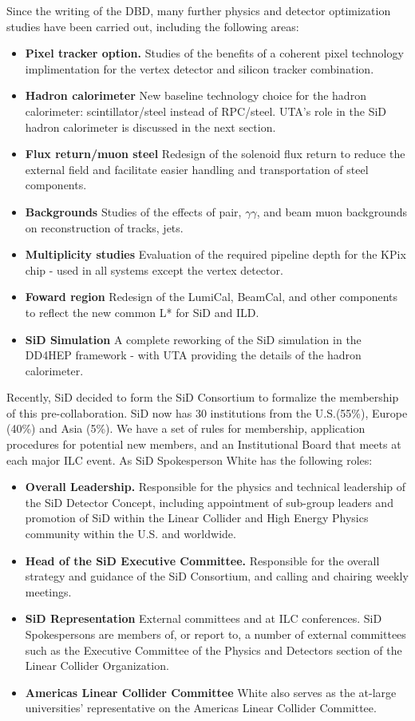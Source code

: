 Since the writing of the DBD, many further physics and detector optimization studies have been carried
out, including the following areas:
\begin{itemize}
\item {\bf Pixel tracker option.} Studies of the benefits of a coherent pixel technology implimentation for the
vertex detector and silicon tracker combination.
\item {\bf Hadron calorimeter} New baseline technology choice for the hadron calorimeter: scintillator/steel instead of RPC/steel.
UTA's role in the SiD hadron calorimeter is discussed in the next section.
\item {\bf Flux return/muon steel} Redesign of the solenoid flux return to reduce the external field and facilitate easier handling
and transportation of steel components. 
\item {\bf Backgrounds} Studies of the effects of pair, $ \gamma\gamma $, and beam muon backgrounds on reconstruction of tracks, jets.
\item {\bf Multiplicity studies} Evaluation of the required pipeline depth for the KPix chip - used in all systems except the vertex
 detector.
 \item {\bf Foward region} Redesign of the LumiCal, BeamCal, and other components to reflect the new common L* for SiD and ILD.
 \item{\bf SiD Simulation} A complete reworking of the SiD simulation in the DD4HEP framework - with UTA providing the details
 of the hadron calorimeter.
 \end{itemize}
 
Recently, SiD decided to form the SiD Consortium to formalize the membership of this pre-collaboration.
SiD now has 30 institutions from the U.S.(55\%), Europe (40\%) and Asia (5\%).
We have a set of rules for membership, application procedures for potential new members, and an Institutional
Board that meets at each major ILC event. As SiD Spokesperson White has the following roles:

\begin{itemize}
\item {\bf Overall Leadership.} Responsible for the physics and technical leadership of the SiD Detector 
Concept, including appointment of sub-group leaders and promotion of SiD within the Linear Collider 
and High Energy Physics community within the U.S. and worldwide.
\item {\bf Head of the SiD Executive Committee.} Responsible for the overall strategy and guidance of 
the SiD Consortium, and calling and chairing weekly meetings.
\item {\bf SiD Representation} External committees and at ILC conferences. SiD Spokespersons are members of, 
or report to, a number of external committees such as the Executive Committee of the Physics and Detectors section of the 
Linear Collider Organization.
\item{\bf Americas Linear Collider Committee} White also serves as the at-large universities' representative on the 
Americas Linear Collider Committee.
\end{itemize}

